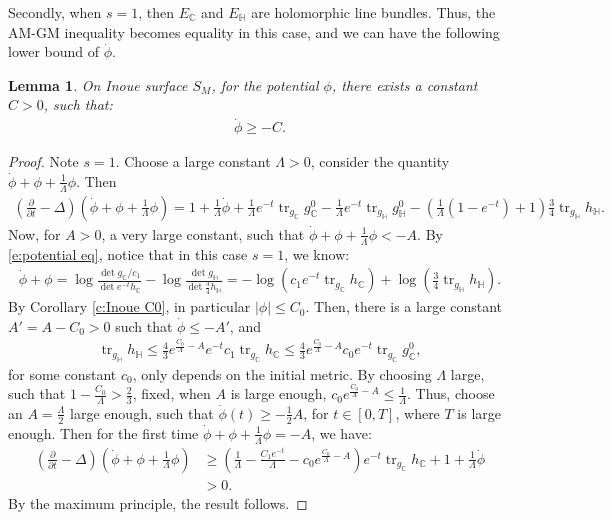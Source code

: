 \documentclass[12pt]{amsart}
\numberwithin{equation}{section}
\newtheorem{lemma}[prop]{Lemma}
\numberwithin{prop}{section}
\theoremstyle{definition}
\begin{document}
Secondly, when $s = 1$, then $E_\mathbb{C}$ and $E_\mathbb{H}$ are holomorphic line bundles. Thus, the AM-GM inequality becomes equality in this case, and we can have the following lower bound of $\dot{\phi}$.
\begin{lemma}\label{l:potential derivative lower bound}
    On Inoue surface $S_M$, for the potential $\phi$, there exists a constant $C>0$, such that:
    \begin{align*}
        \dot{\phi}\geq -C.
    \end{align*}
\end{lemma}
\begin{proof}
    Note $s=1$. Choose a large constant $\Lambda>0$, consider the quantity $\dot{\phi} + \phi+\frac{1}{\Lambda}\phi$. Then
    \begin{align*}
        (\frac{\partial}{\partial t} - \Delta)(\dot{\phi}+\phi+\frac{1}{\Lambda}\phi) = 1 +\frac{1}{\Lambda}\dot{\phi}+ \frac{1}{\Lambda}e^{-t}\operatorname{tr}_{g_\mathbb{C}}g^0_\mathbb{C} - \frac{1}{\Lambda}e^{-t}\operatorname{tr}_{g_\mathbb{H}}g^0_\mathbb{H} - (\frac{1}{\Lambda}(1-e^{-t})+1)\frac{3}{4}\operatorname{tr}_{g_\mathbb{H}}h_\mathbb{H}.
    \end{align*}
    Now, for $A>0$, a very large constant, such that $\dot{\phi}+\phi +\frac{1}{\Lambda}\phi < -A$. By \eqref{e:potential eq}, notice that in this case $s=1$, we know:
    \begin{align*}
        \dot{\phi} +\phi = \log\frac{\det g_\mathbb{C}/c_1}{\det e^{-t}h_\mathbb{C}} - \log\frac{\det g_\mathbb{H}}{\det \frac{3}{4}h_\mathbb{H}} = -\log(c_1e^{-t}\operatorname{tr}_{g_\mathbb{C}}h_\mathbb{C}) + \log (\frac{3}{4}\operatorname{tr}_{g_\mathbb{H}}h_\mathbb{H}).
    \end{align*}
    By Corollary \ref{c:Inoue C0}, in particular $|\phi|\leq C_0$. Then, there is a large constant $A' = A- C_0>0$ such that $\dot{\phi}\leq -A'$, and 
    \begin{align*}
        \operatorname{tr}_{g_\mathbb{H}}h_\mathbb{H}\leq \frac{4}{3}e^{\frac{C_0}{\Lambda}-A}e^{-t}c_1 \operatorname{tr}_{g_\mathbb{C}}h_\mathbb{C}\leq \frac{4}{3}e^{\frac{C_0}{\Lambda}-A}c_0e^{-t}\operatorname{tr}_{g_\mathbb{C}}g^0_\mathbb{C},
    \end{align*}
    for some constant $c_0$, only depends on the initial metric.
    By choosing $\Lambda$ large, such that $1-\frac{C_0}{\Lambda}>\frac{2}{3}$, fixed, when $A$ is large enough, $c_0e^{\frac{C_0}{\Lambda}-A} \leq \frac{1}{\Lambda}$. Thus, choose an $A = \frac{\Lambda}{2}$ large enough, such that $\dot{\phi}(t)\geq -\frac{1}{2}A$, for $t\in[0,T]$, where $T$ is large enough. Then for the first time $\dot{\phi}+\phi +\frac{1}{\Lambda}\phi = -A$, we have:
    \begin{align*}
        (\frac{\partial}{\partial t}-\Delta)(\dot{\phi} + \phi +\frac{1}{\Lambda}\phi)&\geq (\frac{1}{\Lambda } - \frac{C_1e^{-t}}{\Lambda}-c_0e^{\frac{C_0}{\Lambda}-A})e^{-t}\operatorname{tr}_{g_\mathbb{C}}h_\mathbb{C} + 1+ \frac{1}{\Lambda}\dot{\phi}\\
        &>0.
    \end{align*}
    By the maximum principle, the result follows.
\end{proof}
\end{document}
